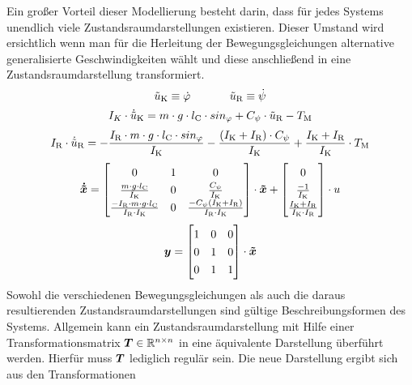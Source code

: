 Ein großer Vorteil dieser Modellierung besteht darin, dass für jedes Systems unendlich viele Zustandsraumdarstellungen existieren\cite[S. 54]{Beucher}. Dieser Umstand wird ersichtlich wenn man für die Herleitung der Bewegungsgleichungen alternative generalisierte Geschwindigkeiten wählt und diese anschließend in eine Zustandsraumdarstellung transformiert.
\begin{equation}
\tilde{u}_{\text{K}} \equiv \dot{\varphi} \hspace{35pt} \tilde{u}_{\text{R}} \equiv \dot{\psi}
\end{equation}
\begin{equation}
I_K\cdot \dot{\tilde{u}}_{\text{K}} = m\cdot g \cdot l_{\text{C}} \cdot sin_{\varphi} + C_{\psi}\cdot \tilde{u}_{\text{R}} - T_{\text{M}}
\end{equation}
\begin{equation}
I_{\text{R}}\cdot \dot{\tilde{u}}_{\text{R}} = -\frac{I_{\text{R}}\cdot m\cdot g\cdot l_{\text{C}}\cdot sin_{\varphi}}{I_{\text{K}}} - \frac{(I_{\text{K}} + I_{\text{R}})\cdot C_{\psi}}{I_{\text{K}}} + \frac{I_{\text{K}} + I_{\text{R}}}{I_{\text{K}}}\cdot T_{\text{M}}
\end{equation}
\begin{equation}
\renewcommand*{\arraystretch}{1.3}
\bs{\dot{\tilde{x}}} = \begin{bmatrix}
0 & 1 & 0 
\\
\frac{m\cdot g\cdot l\idx{C}}{I\idx{K}} & 0 & \frac{C_{\psi}}{I\idx{K}}
\\
\frac{-I\idx{R}\cdot m\cdot g\cdot l\idx{C}}{I\idx{R}\cdot I\idx{K}} & 0 & \frac{-C_{\psi}(I\idx{K}+I\idx{R})}{I\idx{R}\cdot I\idx{K}} 
\end{bmatrix}\cdot \bs{\tilde{x}}
+
\begin{bmatrix}
0 \\ \frac{-1}{I\idx{K}} \\ \frac{I\idx{K}+I\idx{R}}{I\idx{K}\cdot I\idx{R}}
\end{bmatrix} \cdot u
\end{equation}
\begin{equation}
\bs{y} = \begin{bmatrix}
1 & 0 & 0 \\
0 & 1 & 0 \\
0 & 1 & 1 \\
\end{bmatrix} \cdot \bs{\tilde{x}}
\end{equation}
Sowohl die verschiedenen Bewegungsgleichungen als auch die daraus resultierenden Zustandsraumdarstellungen sind gültige Beschreibungsformen des Systems. Allgemein kann ein Zustandsraumdarstellung mit Hilfe einer Transformationsmatrix $\boldsymbol{T} \in \mathbb{R}^{n\times n}$ in eine äquivalente Darstellung überführt werden. Hierfür muss $\boldsymbol{T}$ lediglich regulär sein. Die neue Darstellung ergibt sich aus den Transformationen
